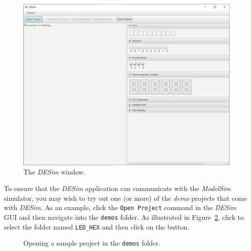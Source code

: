 \documentclass[epsfig,10pt,fullpage]{article} \addtolength{\textwidth}{1.5in}
\begin{document}
\begin{figure}[h]
	\begin{center}
		\includegraphics[width = \textwidth]{figures/DESim_GUI.png}
	\end{center}
          \caption{The {\it DESim} window.}
	\label{fig:GUI}
\end{figure}

\noindent
To ensure that the {\it DESim} application can communicate with the {\it ModelSim} simulator, you
may wish to try out one (or more) of the {\it demo} projects that come with {\it DESim}. As
an example, click the \texttt{Open Project} command in the {\it DESim} GUI and then 
navigate into
the \texttt{demos} folder. As illustrated in Figure~\ref{fig:demos}, click to select the 
folder named \texttt{LED\_HEX} and then click on the  button.

\begin{figure}[h]
	\begin{center}
        \setlength{\fboxsep}{0pt}
	\end{center}
          \caption{Opening a sample project in the \texttt{demos} folder.}
	\label{fig:demos}
\end{figure}
\end{document}
